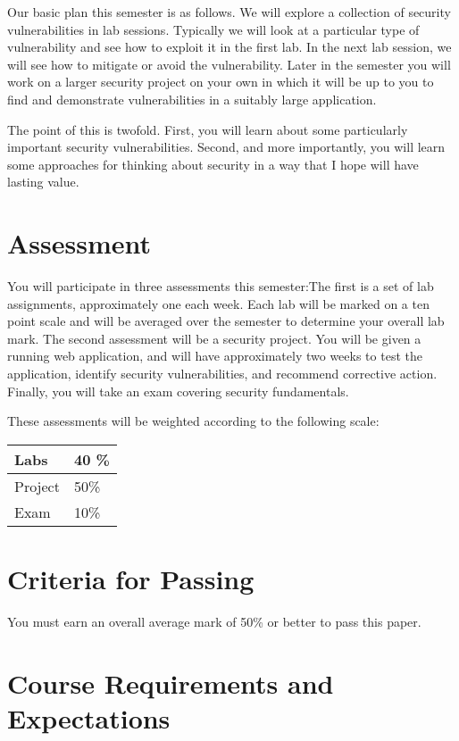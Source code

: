 \documentclass{article}
\begin{document}
Our basic plan this semester is as follows. We will explore a collection of security vulnerabilities in lab sessions.  Typically we will look at a particular type of vulnerability and see how to exploit it in the first lab. In the next lab session, we will see how to mitigate or avoid the vulnerability.  Later in the semester you will work on a larger security project on your own in which it will be up to you to find and demonstrate vulnerabilities in a suitably large application.

The point of this is twofold. First, you will learn about some particularly important security vulnerabilities. Second, and more importantly, you will learn some approaches for thinking about security in a way that I hope will have lasting value.



\section*{Assessment}
You will participate in three assessments this semester:The first is a set of lab assignments, approximately one each week.  Each lab will be 
marked on a ten point scale and will be averaged over the semester to determine your overall lab mark.  The second assessment will be a security project. You will be given a running web application, and will have approximately two weeks to test the application, identify security vulnerabilities, and recommend corrective action. Finally, you will take an exam covering security fundamentals.

These assessments will be weighted according to the following scale:

\vspace{3mm}
\begin{tabular}{|l|l|}
	\hline
	Labs & 40 \% \\ \hline
	Project & 50\% \\ \hline
	Exam & 10\% \\ \hline
\end{tabular}



  
\section*{Criteria for Passing}
You must earn an overall average mark of 50\% or better to pass this paper.

\section*{Course Requirements and Expectations}
\end{document}
